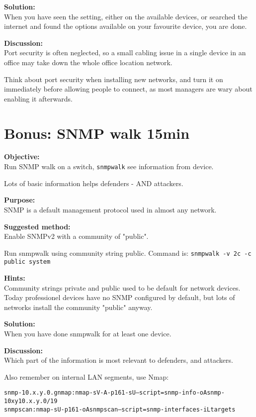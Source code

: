 \documentclass[a4paper,11pt,notitlepage]{report}
\begin{document}
{\bf Solution:}\\
When you have seen the setting, either on the available devices, or searched the internet and found the options available on your favourite device, you are done.

{\bf Discussion:}\\
Port security is often neglected, so a small cabling issue in a single device in an office may take down the whole office location network.

Think about port security when installing new networks, and turn it on immediately before allowing people to connect, as most managers are wary about enabling it afterwards.



\chapter{Bonus: SNMP walk 15min}
\label{ex:snmpwalk}

{\bf Objective:}\\
Run SNMP walk on a switch, \verb+snmpwalk+ see information from device.

Lots of basic information helps defenders - AND attackers.

{\bf Purpose:}\\
SNMP is a default management protocol used in almost any network.

{\bf Suggested method:}\\
Enable SNMPv2 with a community of "public".

Run snmpwalk using community string public.
Command is: \verb+snmpwalk -v 2c -c public system+


{\bf Hints:}\\
Community strings private and public used to be default for network devices. Today professionel devices have no SNMP configured by default, but lots of networks install the community "public" anyway.

{\bf Solution:}\\
When you have done snmpwalk for at least one device.

{\bf Discussion:}\\
Which part of the information is most relevant to defenders, and attackers.

Also remember on internal LAN segments, use Nmap:
\begin{alltt}
snmp-10.x.y.0.gnmap: nmap -sV -A -p 161 -sU --script=snmp-info -oA snmp-10xy 10.x.y.0/19
snmpscan: nmap -sU -p 161 -oA snmpscan --script=snmp-interfaces -iL targets
\end{alltt}
\end{document}
